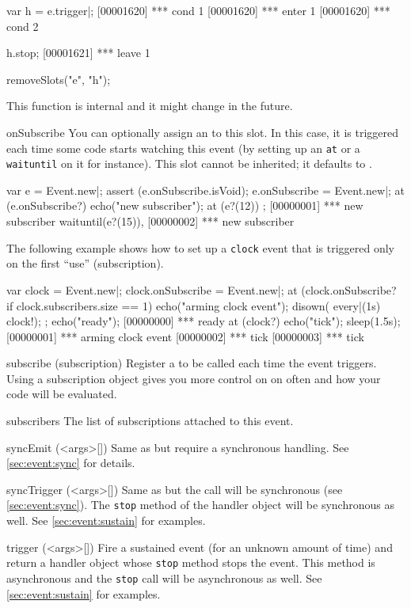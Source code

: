 \begin{urbiscriptapi}
\begin{urbiscript}
var h = e.trigger|;
[00001620] *** cond 1
[00001620] *** enter 1
[00001620] *** cond 2

h.stop;
[00001621] *** leave 1
\end{urbiscript}
\begin{urbicomment}
removeSlots("e", "h");
\end{urbicomment}
This function is internal and it might change in the future.


\item[onSubscribe]%
  You can optionally assign an  to this slot.  In this
  case, it is triggered each time some code starts watching this event (by
  setting up an \lstinline|at| or a \lstinline|waituntil| on it for
  instance).  This slot cannot be inherited; it defaults to
  .

\begin{urbiscript}
var e = Event.new|;
assert (e.onSubscribe.isVoid);
e.onSubscribe = Event.new|;
at (e.onSubscribe?)
  echo("new subscriber");
at (e?(12)) {};
[00000001] *** new subscriber
waituntil(e?(15)),
[00000002] *** new subscriber
\end{urbiscript}

  The following example shows how to set up a \lstinline|clock| event that
  is triggered only on the first ``use'' (subscription).
\begin{urbiscript}
var clock = Event.new|;
clock.onSubscribe = Event.new|;
at (clock.onSubscribe? if clock.subscribers.size == 1)
{
  echo("arming clock event");
  disown({ every|(1s) clock!});
};
echo("ready");
[00000000] *** ready
at (clock?)
  echo("tick");
sleep(1.5s);
[00000001] *** arming clock event
[00000002] *** tick
[00000003] *** tick
\end{urbiscript}


\item[subscribe](subscription)%
  Register a  to be called each time the event triggers.
  Using a subscription object gives you more control on on often and how
  your code will be evaluated.


\item[subscribers]
  The list of subscriptions attached to this event.


\item[syncEmit](<args>[])%
  Same as  but require a synchronous handling.  See
  \autoref{sec:event:sync} for details.


\item[syncTrigger](<args>[])%
  Same as  but the call will be synchronous (see
  \autoref{sec:event:sync}). The \lstinline|stop| method of the handler
  object will be synchronous as well.  See \autoref{sec:event:sustain} for
  examples.


\item[trigger](<args>[])%
  Fire a sustained event (for an unknown amount of time) and return a
  handler object whose \lstinline|stop| method stops the event. This method
  is asynchronous and the \lstinline|stop| call will be asynchronous as
  well.  See \autoref{sec:event:sustain} for examples.
\end{urbiscriptapi}

